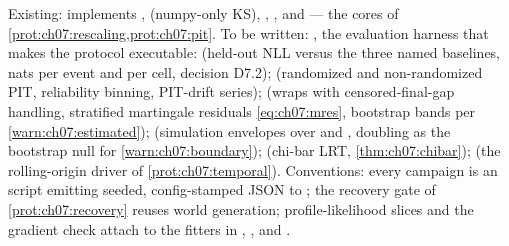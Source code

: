 \begin{codehooks}
Existing:  implements
,  (numpy-only KS),
, , and
 --- the cores of
\cref{prot:ch07:rescaling,prot:ch07:pit}. To be written:
, the evaluation harness that makes the protocol
executable:  (held-out NLL versus the three
named baselines, nats per event and per cell, decision D7.2);
 (randomized and non-randomized PIT, reliability
binning, PIT-drift series);  (wraps
 with censored-final-gap handling, stratified martingale
residuals \cref{eq:ch07:mres}, bootstrap bands per
\cref{warn:ch07:estimated});  (simulation
envelopes over  and
, doubling as the bootstrap null for
\cref{warn:ch07:boundary});  (chi-bar LRT,
\cref{thm:ch07:chibar});  (the rolling-origin
driver of \cref{prot:ch07:temporal}). Conventions: every campaign is an
 script emitting seeded, config-stamped
JSON to ; the recovery gate of \cref{prot:ch07:recovery}
reuses  world generation; profile-likelihood slices and
the gradient check attach to the fitters in
, , and
.
\end{codehooks}
